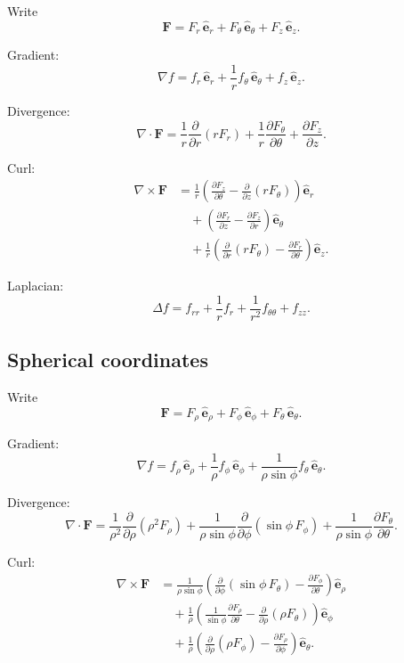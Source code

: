 Write
\[
    \mathbf F
    =
    F_r\,\widehat{\mathbf e}_r
    +
    F_\theta\,\widehat{\mathbf e}_\theta
    +
    F_z\,\widehat{\mathbf e}_z.
\]

Gradient:
\[
\boxed{
    \nabla f
    =
    f_r\,\widehat{\mathbf e}_r
    +
    \frac1r f_\theta\,\widehat{\mathbf e}_\theta
    +
    f_z\,\widehat{\mathbf e}_z.
}
\]

Divergence:
\[
\boxed{
    \nabla\cdot\mathbf F
    =
    \frac1r\frac{\partial}{\partial r}(rF_r)
    +
    \frac1r\frac{\partial F_\theta}{\partial\theta}
    +
    \frac{\partial F_z}{\partial z}.
}
\]

Curl:
\[
\boxed{
\begin{aligned}
\nabla\times\mathbf F
&=
\frac1r
\left(
    \frac{\partial F_z}{\partial\theta}
    -
    \frac{\partial}{\partial z}(rF_\theta)
\right)\widehat{\mathbf e}_r\\[1mm]
&\quad+
\left(
    \frac{\partial F_r}{\partial z}
    -
    \frac{\partial F_z}{\partial r}
\right)\widehat{\mathbf e}_\theta\\[1mm]
&\quad+
\frac1r
\left(
    \frac{\partial}{\partial r}(rF_\theta)
    -
    \frac{\partial F_r}{\partial\theta}
\right)\widehat{\mathbf e}_z.
\end{aligned}
}
\]

Laplacian:
\[
\boxed{
    \Delta f
    =
    f_{rr}
    +
    \frac1r f_r
    +
    \frac1{r^2}f_{\theta\theta}
    +
    f_{zz}.
}
\]

\subsection*{Spherical coordinates}

Write
\[
    \mathbf F
    =
    F_\rho\,\widehat{\mathbf e}_\rho
    +
    F_\phi\,\widehat{\mathbf e}_\phi
    +
    F_\theta\,\widehat{\mathbf e}_\theta.
\]

Gradient:
\[
\boxed{
    \nabla f
    =
    f_\rho\,\widehat{\mathbf e}_\rho
    +
    \frac1\rho f_\phi\,\widehat{\mathbf e}_\phi
    +
    \frac1{\rho\sin\phi}f_\theta\,\widehat{\mathbf e}_\theta.
}
\]

Divergence:
\[
\boxed{
    \nabla\cdot\mathbf F
    =
    \frac1{\rho^2}
    \frac{\partial}{\partial\rho}(\rho^2F_\rho)
    +
    \frac1{\rho\sin\phi}
    \frac{\partial}{\partial\phi}(\sin\phi\,F_\phi)
    +
    \frac1{\rho\sin\phi}
    \frac{\partial F_\theta}{\partial\theta}.
}
\]

Curl:
\[
\boxed{
\begin{aligned}
\nabla\times\mathbf F
&=
\frac1{\rho\sin\phi}
\left(
    \frac{\partial}{\partial\phi}(\sin\phi\,F_\theta)
    -
    \frac{\partial F_\phi}{\partial\theta}
\right)
\widehat{\mathbf e}_\rho\\[1mm]
&\quad+
\frac1\rho
\left(
    \frac1{\sin\phi}\frac{\partial F_\rho}{\partial\theta}
    -
    \frac{\partial}{\partial\rho}(\rho F_\theta)
\right)
\widehat{\mathbf e}_\phi\\[1mm]
&\quad+
\frac1\rho
\left(
    \frac{\partial}{\partial\rho}(\rho F_\phi)
    -
    \frac{\partial F_\rho}{\partial\phi}
\right)
\widehat{\mathbf e}_\theta.
\end{aligned}
}
\]

